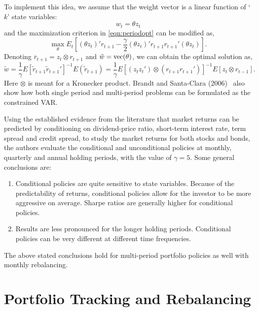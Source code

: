 To implement this idea, we assume that the weight vector is a linear function of `$k$' state variables:
	\begin{equation} \label{eqn:statevar}
	w_t= \theta z_t
	\end{equation}
and the maximization criterion in \eqref{eqn:periodopt} can be modified as,
	\begin{equation} \label{eqn:prevmodified}
	\max_\theta E_t\left[(\theta z_t)' r_{t+1} - \frac{\gamma}{2}(\theta z_t)' r_{t+1} r_{t+1}' (\theta z_t)\right].
	\end{equation}
Denoting $\overline{r}_{t+1}= z_t \otimes r_{t+1}$ and $\tilde{w}= \operatorname{vec}(\theta)$, we can obtain the optimal solution as,
	\begin{equation} \label{eqn:modifiedsolution}
	\tilde{w}= \frac{1}{\gamma} E[\tilde{r}_{t+1} \tilde{r}_{t+1}']^{-1} E(\tilde{r}_{t+1})= \frac{1}{\gamma} E[(z_t z_t') \otimes (r_{t+1}r_{t+1}')]^{-1} E[z_t \otimes r_{t-1}].
	\end{equation}
Here $\otimes$ is meant for a Kronecker product. Brandt and Santa-Clara (2006)~\cite{bransc} also show how both single period and multi-period problems can be formulated as the constrained VAR. 


Using the established evidence from the literature that market returns can be predicted by conditioning on dividend-price ratio, short-term interest rate, term spread and credit spread, to study the market returns for both stocks and bonds, the authors evaluate the conditional and unconditional policies at monthly, quarterly and annual holding periods, with the value of $\gamma= 5$. Some general conclusions are:
	\begin{enumerate}[--]
	\item Conditional policies are quite sensitive to state variables. Because of the predictability of returns, conditional policies allow for the investor to be more aggressive on average. Sharpe ratios are generally higher for conditional policies.
	\item Results are less pronounced for the longer holding periods. Conditional policies can be very different at different time frequencies. 
	\end{enumerate}
The above stated conclusions hold for multi-period portfolio policies as well with monthly rebalancing. 



\section{Portfolio Tracking and Rebalancing}

